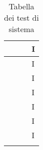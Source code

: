 \begin{center}
\begin{longtable}{ | C{2.5cm} |C{2cm} |C{7cm} |C{1.5cm}|}
                     &     &                      & I              \\\hline
                     &  &                      & I              \\\hline
                     &  &                      & I              \\\hline
        \setcounter{subCount}{0}
                     &     &                      & I              \\\hline
                     &  &                      & I              \\\hline
                     &  &                      & I              \\\hline
                     &  &                      & I              \\\hline

        \caption{Tabella dei test di sistema}
    \end{longtable}
\end{center}
\setcounter{subCount}{0}
\setcounter{rowcount}{0}
